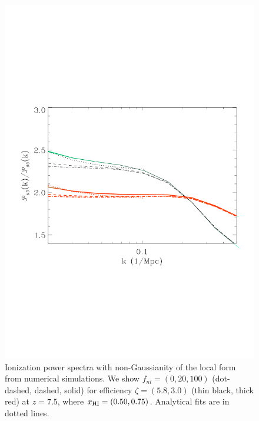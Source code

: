 \documentclass{PoS}
\newcommand{\fnl}{f_{nl}}
\begin{document}
\begin{figure}[!t]
\includegraphics[scale=0.3]{figures/figure2.pdf}
\caption{Ionization power spectra with non-Gaussianity of the local form from numerical simulations. 
We show $\fnl = (0,20,100)$ (dot-dashed, dashed, solid) for efficiency $\zeta = (5.8, 3.0)$ (thin black, thick red) at $z = 7.5$, where $x_{\rm HI} = (0.50, 0.75)$. 
Analytical fits are in dotted lines.}
\label{figurett}
\end{figure}
\end{document}
